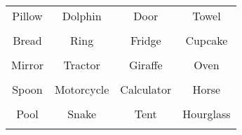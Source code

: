 \documentclass[12pt,a4paper]{article}
\begin{document}
\thispagestyle{empty}
\begin{table}[]
\centering
\Huge
\begin{tabular}{cccc}
 Pillow& Dolphin& Door& Towel\\  & & & \\
 Bread& Ring& Fridge& Cupcake\\  & & & \\
 Mirror& Tractor& Giraffe& Oven\\  & & & \\
 Spoon& Motorcycle& Calculator& Horse\\  & & & \\
 Pool& Snake& Tent& Hourglass\\  & & & \\
\end{tabular}
\end{table}
\end{document}
